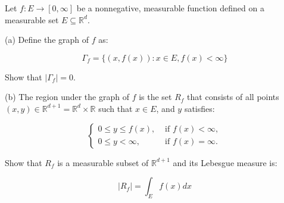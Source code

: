 \documentclass[10pt]{article}
\newenvironment{problem}[2][Problem]{\begin{trivlist}
\item[\hskip \labelsep {\bfseries #1}\hskip \labelsep {\bfseries #2.}]}{\end{trivlist}}
\begin{document}
\begin{problem}{4.2.17}
Let $f: E \to [0,\infty]$ be a nonnegative, measurable function defined on a measurable set $E \subseteq \mathbb{R}^d$.

(a) Define the graph of $f$ as:

$$ \Gamma_f = \{ (x,f(x)) : x \in E, f(x) < \infty \}$$

Show that $|\Gamma_f| = 0$.

(b) The region under the graph of $f$ is the set $R_f$ that consists of all points $(x,y) \in \mathbb{R}^{d+1} = \mathbb{R}^d \times \mathbb{R}$ such that $x \in E$, and $y$ satisfies:

$$\begin{cases}
0 \leq y \leq f(x), & \text{ if } f(x) < \infty,\\
0 \leq y < \infty, & \text { if } f(x) = \infty.
\end{cases}$$

Show that $R_f$ is a measurable subset of $\mathbb{R}^{d+1}$ and its Lebesgue measure is:

$$ |R_f| = \int_E f(x) dx $$
\end{problem}
\end{document}
